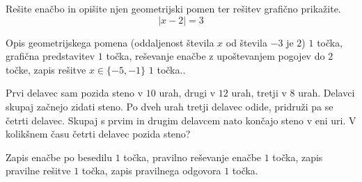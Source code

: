 \documentclass[addpoints,12pt]{exam}
\begin{document}
\begin{questions}
\newpage
    \question[5]
    Rešite enačbo in opišite njen geometrijski pomen ter rešitev grafično prikažite.
    $$  \left\lvert x-2\right\rvert=3 $$
    
    
    \begin{solution}[7cm]
        Opis geometrijskega pomena (oddaljenost števila $x$ od števila $-3$ je $2$) $1$ točka, grafična predstavitev $1$ točka, reševanje enačbe z upoštevanjem pogojev do $2$ točke, zapis rešitve $x\in\{-5,-1\}$ $1$ točka..
    \end{solution}


    \newpage





    
    



    \question[5]
    Prvi delavec sam pozida steno v $10$ urah, drugi v $12$ urah, tretji v $8$ urah. Delavci
    skupaj začnejo zidati steno. Po dveh urah tretji delavec odide, pridruži pa se četrti delavec.
    Skupaj s prvim in drugim delavcem nato končajo steno v eni uri. V kolikšnem času četrti delavec
    pozida steno?
    
    
    \begin{solution}[13cm]
        Zapis enačbe po besedilu $1$ točka, pravilno reševanje enačbe $1$ točka, zapis pravilne rešitve $1$ točka, zapis pravilnega odgovora $1$ točka.
    \end{solution}






    



    

\end{questions}
\end{document}
